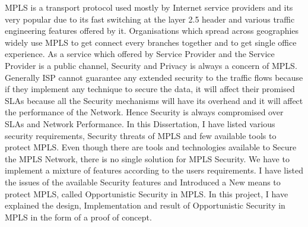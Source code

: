 \documentclass[a4paper, 12pt, oneside]{report}         %
\begin{document}
\begin{thesisabstract}                          %
MPLS is a transport protocol used mostly by Internet service providers and its very popular due to its fast switching at the layer 2.5 header and various traffic engineering features offered by it. Organisations which spread across geographies widely use MPLS to get connect every branches together and to get single office experience. As a service which offered by Service Provider and the Service Provider is a public channel, Security and Privacy is always a concern of MPLS. Generally ISP cannot guarantee any extended security to the traffic flows because if they implement any technique to secure the data, it will affect their promised SLAs because all the Security mechanisms will have its overhead and it will affect the performance of the Network. Hence Security is always compromised over SLAs and Network Performance. In this Dissertation, I have listed various security requirements, Security threats of MPLS and few available tools to protect MPLS. Even though there are tools and technologies available to Secure the MPLS Network, there is no single solution for MPLS Security. We have to implement a mixture of features according to the users requirements. I have listed the issues of the available Security features and Introduced a New means to protect MPLS, called Opportunistic Security in MPLS. In this project, I have explained the design, Implementation and result of Opportunistic Security in MPLS in the form of a proof of concept.

\end{thesisabstract}


\tableofcontents                                  %
\listoftables                                     %
\listoffigures                                    %

  
  
  
  
  
  

  
\begin{appendix}



\end{appendix}


\end{document}
